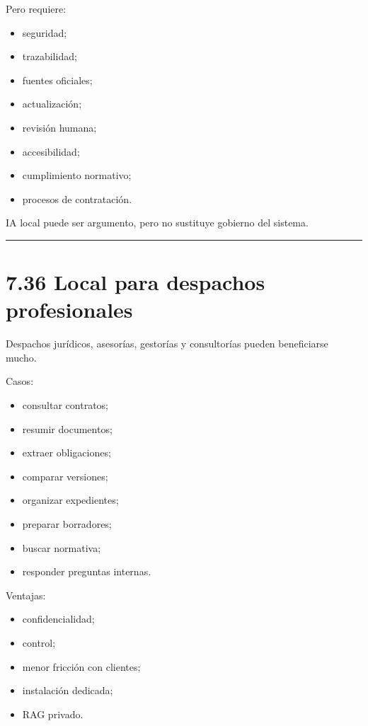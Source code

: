 Pero requiere:

\begin{itemize}
\tightlist
\item
  seguridad;
\item
  trazabilidad;
\item
  fuentes oficiales;
\item
  actualización;
\item
  revisión humana;
\item
  accesibilidad;
\item
  cumplimiento normativo;
\item
  procesos de contratación.
\end{itemize}

IA local puede ser argumento, pero no sustituye gobierno del sistema.

\begin{center}\rule{0.5\linewidth}{0.5pt}\end{center}

\section{7.36 Local para despachos
profesionales}\label{local-para-despachos-profesionales}

Despachos jurídicos, asesorías, gestorías y consultorías pueden
beneficiarse mucho.

Casos:

\begin{itemize}
\tightlist
\item
  consultar contratos;
\item
  resumir documentos;
\item
  extraer obligaciones;
\item
  comparar versiones;
\item
  organizar expedientes;
\item
  preparar borradores;
\item
  buscar normativa;
\item
  responder preguntas internas.
\end{itemize}

Ventajas:

\begin{itemize}
\tightlist
\item
  confidencialidad;
\item
  control;
\item
  menor fricción con clientes;
\item
  instalación dedicada;
\item
  RAG privado.
\end{itemize}

